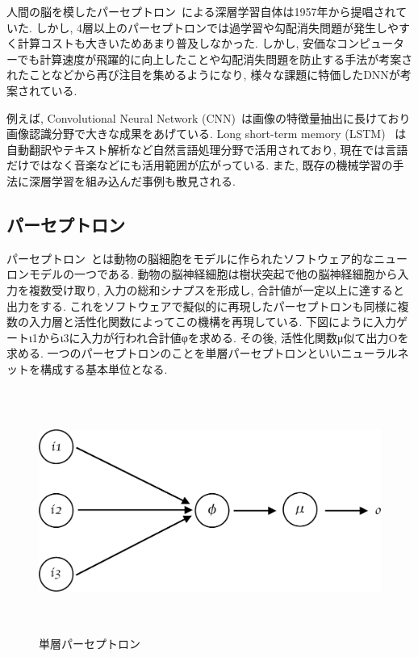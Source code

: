 人間の脳を模したパーセプトロン~\cite{Perceptron}による深層学習自体は1957年から提唱されていた. しかし, 4層以上のパーセプトロンでは過学習や勾配消失問題が発生しやすく計算コストも大きいためあまり普及しなかった.
しかし, 安価なコンピューターでも計算速度が飛躍的に向上したことや勾配消失問題を防止する手法が考案されたことなどから再び注目を集めるようになり, 様々な課題に特価したDNNが考案されている.

例えば, Convolutional Neural Network (CNN)~\cite{CNN}は画像の特徴量抽出に長けており画像認識分野で大きな成果をあげている.
Long short-term memory (LSTM) ~\cite{LSTM}は自動翻訳やテキスト解析など自然言語処理分野で活用されており, 現在では言語だけではなく音楽などにも活用範囲が広がっている.
また, 既存の機械学習の手法に深層学習を組み込んだ事例も散見される.

\subsection{パーセプトロン}

パーセプトロン~\cite{Perceptron}とは動物の脳細胞をモデルに作られたソフトウェア的なニューロンモデルの一つである.
動物の脳神経細胞は樹状突起で他の脳神経細胞から入力を複数受け取り, 入力の総和シナプスを形成し, 合計値が一定以上に達すると出力をする. 
これをソフトウェアで擬似的に再現したパーセプトロンも同様に複数の入力層と活性化関数によってこの機構を再現している.
下図にように入力ゲートι1からι3に入力が行われ合計値φを求める. その後, 活性化関数μ似て出力Οを求める.
一つのパーセプトロンのことを単層パーセプトロンといいニューラルネットを構成する基本単位となる. 

\begin{figure}[H]
    \centering
    \includegraphics[clip,height = 8.0cm]{assets/Single_Perceptron.eps}
    \caption{単層パーセプトロン}  \label{sample}
\end{figure}




